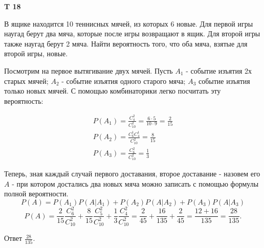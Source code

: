 \documentclass[a4paper,12pt]{article} %
\begin{document}
\begin{example}\textbf{T 18}

В ящике находится 10 теннисных мячей, из которых 6 новые. 
Для первой игры наугад берут два мяча, которые после игры возвращают в ящик. 
Для второй игры также наугад берут 2 мяча. 
Найти вероятность того, что оба мяча, взятые для второй игры, новые.

Посмотрим на первое вытягивание двух мячей. Пусть $ A_1$ - событие изъятия 2х старых мячей; 
$A_2$ - событие изъятия одного старого мяча; 
$A_3$ событие изъятия только новых мячей.
С помощью комбинаторики легко посчитать эту вероятность:

\begin{align}
P(A_1)=\frac{C_4^2}{C_{10}^2}=\frac{6\cdot 5}{10\cdot 9}=\frac{2}{15} \\
P(A_2)=\frac{C_6^1C_4^1}{C_{10}^2}=\frac{8}{15}\\
P(A_3)=\frac{C_6^2}{C_{10}^2}=\frac{1}{3}
\end{align}

Теперь, зная каждый случай первого доставания, второе доставание - назовем его $A$ - при котором достались два новых мяча можно записать с помощью формулы полной вероятности.
$$ P(A)=P(A_1) P(A|A_1)+P(A_2) P(A|A_2)+P(A_3) P(A|A_3)$$
\[ P(A)=\frac{2}{15}\frac{C_6^2}{C_{10}^2}+\frac{8}{15} \frac{C_5^2}{C_{10}^2} +\frac{1}{3}\frac{C_4^2}{C_{10}^2}=\frac{2}{45}+\frac{16}{135}+\frac{2}{45}=
\frac{12+16}{135}=\frac{28}{135}.
\]

Ответ $ \frac{28}{135}$.


\end{example}
\end{document}
